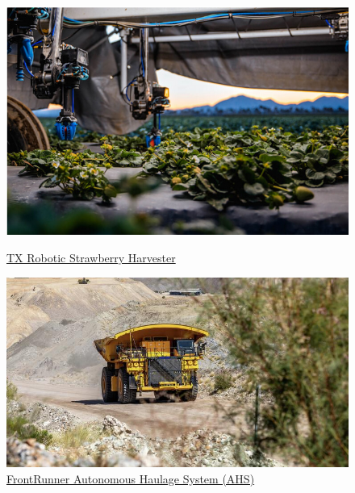 \begin{figure}[ht!]
	\centering
	\begin{minipage}{0.3\linewidth}
		\centering
		\includegraphics[width=\linewidth]{figs/strawberry.png}
		\caption*{\centering\href{https://advanced.farm/technology/strawberry-harvester/}{TX Robotic Strawberry Harvester}}
	\end{minipage}
	\hspace{3 cm}
	\begin{minipage}{0.3\linewidth}
		\centering
		\includegraphics[width=\linewidth]{figs/komatsu.jpeg}
		\caption*{\centering\href{https://www.komatsu.com/en/technology/smart-mining/loading-and-haulage/autonomous-haulage-system/}{FrontRunner Autonomous Haulage System (AHS)}}
	\end{minipage}
	\hspace{3cm}
	\begin{minipage}{0.3\linewidth}
		\centering

\end{minipage}
\end{figure}
